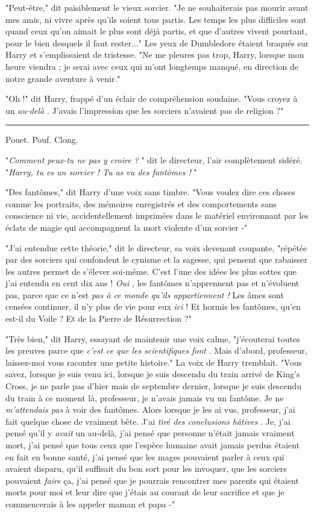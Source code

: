 "Peut-être," dit paisiblement le vieux sorcier. "Je ne souhaiterais pas mourir avant mes amis, ni vivre après qu'ils soient tous partis. Les temps les plus difficiles sont quand ceux qu'on aimait le plus sont déjà partis, et que d'autres vivent pourtant, pour le bien desquels il faut rester..." Les yeux de Dumbledore étaient braqués sur Harry et s'emplissaient de tristesse. "Ne me pleures pas trop, Harry, lorsque mon heure viendra ; je serai avec ceux qui m'ont longtemps manqué, en direction de notre grande aventure à venir."

"Oh !" dit Harry, frappé d'un éclair de compréhension soudaine. "Vous croyez à un \emph{au-delà} . J'avais l'impression que les sorciers n'avaient pas de religion ?"
\par\noindent\rule{\textwidth}{0.4pt}
Pouet. Pouf. Clong.

"\emph{Comment peux-tu ne pas y croire ?} " dit le directeur, l'air complètement sidéré. "\emph{Harry, tu es un sorcier ! Tu as vu des fantômes !} "

"Des fantômes," dit Harry d'une voix sans timbre. "Vous voulez dire ces choses comme les portraits, des mémoires enregistrés et des comportements sans conscience ni vie, accidentellement imprimées dans le matériel environnant par les éclats de magie qui accompagnent la mort violente d'un sorcier -"

"J'ai entendue cette théorie," dit le directeur, sa voix devenant coupante, "répétée par des sorciers qui confondent le cynisme et la sagesse, qui pensent que rabaisser les autres permet de s'élever soi-même. C'est l'une des idées les plus sottes que j'ai entendu en cent dix ans ! \emph{Oui} , les fantômes n'apprennent pas et n'évoluent pas, parce que ce n'est \emph{pas à ce monde qu'ils appartiennent !}  Les âmes sont censées continuer, il n'y plus de vie pour eux \emph{ici}  ! Et hormis les fantômes, qu'en est-il du Voile ? Et de la Pierre de Résurrection ?"

"Très bien," dit Harry, essayant de maintenir une voix calme, "j'écouterai toutes les preuves parce que \emph{c'est ce que les scientifiques font} . Mais d'abord, professeur, laissez-moi vous raconter une petite histoire." La voix de Harry tremblait. "Vous savez, lorsque je suis venu ici, lorsque je suis descendu du train arrivé de King's Cross, je ne parle pas d'hier mais de septembre dernier, lorsque je suis descendu du train à ce moment là, professeur, je n'avais jamais vu un fantôme. Je ne \emph{m'attendais pas}  à voir des fantômes. Alors lorsque je les ai vus, professeur, j'ai fait quelque chose de vraiment bête. J'ai \emph{tiré des conclusions hâtives} . Je, j'ai pensé qu'il y \emph{avait}  un au-delà, j'ai pensé que personne n'était jamais vraiment mort, j'ai pensé que tous ceux que l'espèce humaine avait jamais perdus étaient en fait en bonne santé, j'ai pensé que les mages pouvaient parler à ceux qui avaient disparu, qu'il suffisait du bon sort pour les invoquer, que les sorciers pouvaient \emph{faire}  ça, j'ai pensé que je pourrais rencontrer mes parents qui étaient morts pour moi et leur dire que j'étais au courant de leur sacrifice et que je commencerais à les appeler maman et papa -"

